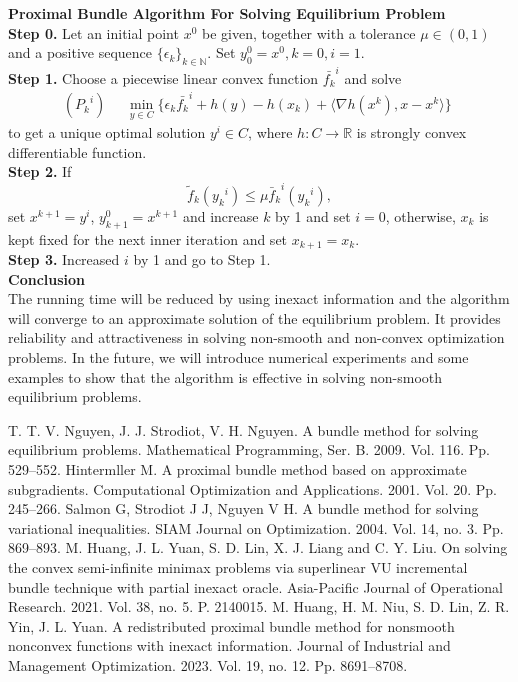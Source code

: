 \documentclass[12pt]{llncs}
\begin{document}
\newpage\noindent\textbf{Proximal Bundle Algorithm For Solving Equilibrium Problem}\\
\noindent \textbf{Step 0.} Let an initial point $x^{0}$ be given, together with a tolerance $\mu\in(0,1)$ and a positive sequence $\{\epsilon_{k}\}_{k\in\mathbb{N} }$. Set $y_{0}^{0}=x^{0}, k=0,i=1$.\\
\noindent \textbf{Step 1.} Choose a piecewise linear convex function $\bar{{f}_{k}}^{i}$ and solve
$$
({{P}_{k}}^{i})\quad \begin{aligned}
\min_{y \in C}  \{\epsilon_{k}\bar{{f}_{k}}^{i}+ h(y)-h(x_{k})+\langle\nabla h(x^{k}),x-x^{k}\rangle\}
\end{aligned}
$$
to get a unique optimal solution $y^{i}\in C$, where $h:C\rightarrow\mathbb{R} $ is strongly convex differentiable function.\\
\textbf{Step 2.} If
$${\tilde{f}_{k}}({y_{k}}^{i})\leq\mu{\bar{f}_{k}}^{i}({y_{k}}^{i}),$$
set $x^{k+1}=y^{i}$, $y_{k+1}^{0}=x^{k+1}$ and increase $k$ by 1 and set $i=0$, otherwise, $ x_k$ is kept fixed for the next inner iteration and set $x_{k+1}=x_k$.\\
\textbf{Step 3.}  Increased $i$ by 1 and go to Step 1.\\
\noindent\textbf{Conclusion}\\
\indent The running time will be reduced by using inexact information and the algorithm will converge to an approximate solution of the equilibrium problem. It provides reliability and attractiveness in solving non-smooth and non-convex optimization problems. In the future, we will introduce numerical experiments and some examples to show that the algorithm is effective in solving non-smooth equilibrium problems.

\begin{thebibliography}{9} %
 T. T. V. Nguyen, J. J. Strodiot, V. H. Nguyen. A bundle method for solving equilibrium problems. Mathematical Programming, Ser. B. 2009. Vol. 116. Pp. 529--552.
 Hintermller M. A proximal bundle method based on approximate subgradients. Computational Optimization and Applications. 2001. Vol. 20. Pp. 245--266.
 Salmon G, Strodiot J J, Nguyen V H. A bundle method for solving variational inequalities. SIAM Journal on Optimization. 2004. Vol. 14, no. 3. Pp. 869--893.
 M. Huang, J. L. Yuan, S. D. Lin, X. J. Liang and C. Y. Liu. On solving the convex semi-infinite minimax problems via superlinear VU incremental bundle technique with partial inexact oracle. Asia-Pacific Journal of Operational Research. 2021. Vol. 38, no. 5. P. 2140015.
 M. Huang, H. M. Niu, S. D. Lin, Z. R. Yin, J. L. Yuan. A redistributed proximal bundle method for nonsmooth nonconvex functions with inexact information. Journal of Industrial and Management Optimization.  2023. Vol. 19, no. 12. Pp. 8691--8708.

\end{thebibliography}
\end{document}
